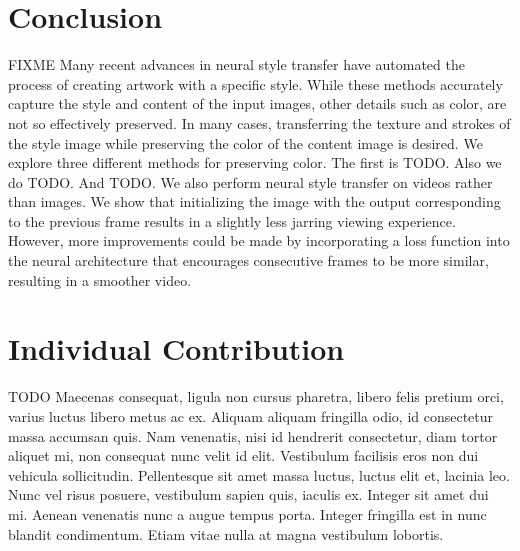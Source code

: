 \documentclass[10pt,twocolumn,letterpaper]{article}
\begin{document}
\section{Conclusion}
FIXME
Many recent advances in neural style transfer have automated the process of creating artwork with a specific style. While these methods accurately capture the style and content of the input images, other details such as color, are not so effectively preserved. In many cases, transferring the texture and strokes of the style image while preserving the color of the content image is desired. We explore three different methods for preserving color. The first is TODO. Also we do TODO. And TODO. We also perform neural style transfer on videos rather than images. We show that initializing the image with the output corresponding to the previous frame results in a slightly less jarring viewing experience. However, more improvements could be made by incorporating a loss function into the neural architecture that encourages consecutive frames to be more similar, resulting in a smoother video.

\section{Individual Contribution}
TODO
Maecenas consequat, ligula non cursus pharetra, libero felis pretium orci, varius luctus libero metus ac ex. Aliquam aliquam fringilla odio, id consectetur massa accumsan quis. Nam venenatis, nisi id hendrerit consectetur, diam tortor aliquet mi, non consequat nunc velit id elit. Vestibulum facilisis eros non dui vehicula sollicitudin. Pellentesque sit amet massa luctus, luctus elit et, lacinia leo. Nunc vel risus posuere, vestibulum sapien quis, iaculis ex. Integer sit amet dui mi. Aenean venenatis nunc a augue tempus porta. Integer fringilla est in nunc blandit condimentum. Etiam vitae nulla at magna vestibulum lobortis.

{\small


}
\end{document}
